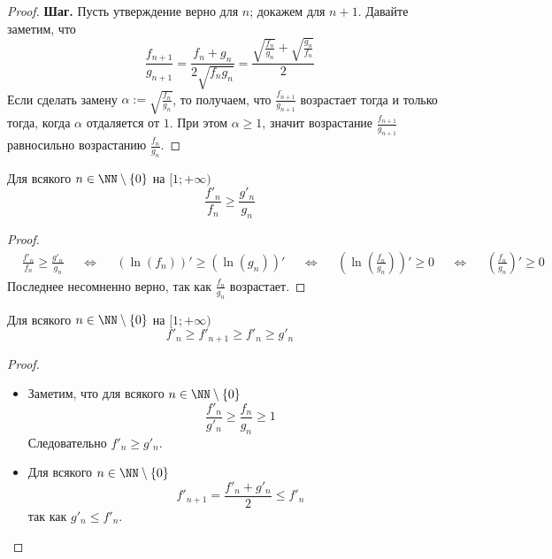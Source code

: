 \documentclass[12pt,a4paper]{article}
\begin{document}
\begin{enumproblem}
\begin{proof}
            \textbf{Шаг.} Пусть утверждение верно для $n$; докажем для $n+1$. Давайте заметим, что
            \[
                \frac{f_{n+1}}{g_{n+1}}
                = \frac{f_n + g_n}{2\sqrt{f_ng_n}}
                = \frac{\sqrt{\frac{f_n}{g_n}} + \sqrt{\frac{g_n}{f_n}}}{2}
            \]
            Если сделать замену $\alpha := \sqrt{\frac{f_n}{g_n}}$, то получаем, что $\frac{f_{n+1}}{g_{n+1}}$ возрастает тогда и только тогда, когда $\alpha$ отдаляется от $1$. При этом $\alpha \geqslant 1$, значит возрастание $\frac{f_{n+1}}{g_{n+1}}$ равносильно возрастанию $\frac{f_n}{g_n}$.
        \end{proof}

        \begin{corollary}
            Для всякого $n \in \NN \setminus \{0\}$ на $[1; +\infty)$
            \[\frac{f'_n}{f_n} \geqslant \frac{g'_n}{g_n}\]
        \end{corollary}

        \begin{proof}
            \begin{align*}
                &\frac{f'_n}{f_n} \geqslant \frac{g'_n}{g_n}&
                &\Longleftrightarrow&
                &(\ln(f_n))' \geqslant (\ln(g_n))'&
                &\Longleftrightarrow&
                &\left(\ln\left(\frac{f_n}{g_n}\right)\right)' \geqslant 0&
                &\Longleftrightarrow&
                &\left(\frac{f_n}{g_n}\right)' \geqslant 0
            \end{align*}
            Последнее несомненно верно, так как $\frac{f_n}{g_n}$ возрастает.
        \end{proof}

        \begin{lemma}
            Для всякого $n \in \NN \setminus \{0\}$ на $[1; + \infty)$
            \[f'_n \geqslant f'_{n+1} \geqslant f'_n \geqslant g'_n\]
        \end{lemma}

        \begin{proof}
            \begin{itemize}
                \item Заметим, что для всякого $n \in \NN \setminus \{0\}$
                    \[\frac{f'_n}{g'_n} \geqslant \frac{f_n}{g_n} \geqslant 1\]
                    Следовательно $f'_n \geqslant g'_n$.
                
                \item Для всякого $n \in \NN \setminus \{0\}$
                    \[f'_{n+1} = \frac{f'_n + g'_n}{2} \leqslant f'_n\]
                    так как $g'_n \leqslant f'_n$.
                

\end{itemize}
\end{proof}
\end{enumproblem}
\end{document}
